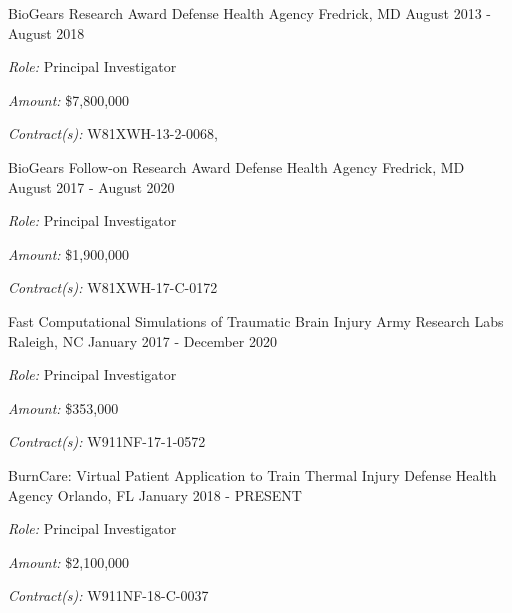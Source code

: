 
\begin{cventries}

  \cventry
    {BioGears Research Award} %
    {Defense Health Agency} %
    {Fredrick, MD} %
    {August 2013 - August 2018} %
     {
     \begin{cvitems}
     \item{\textit{Role:} Principal Investigator}
     \item{\textit{Amount:} \$7,800,000}
     \item{\textit{Contract(s):} W81XWH-13-2-0068,}
     \end{cvitems}
     }

  \cventry
    {BioGears Follow-on Research Award} %
    {Defense Health Agency} %
    {Fredrick, MD} %
    {August 2017 - August 2020} %
     {
     \begin{cvitems}
     \item{\textit{Role:} Principal Investigator}
     \item{\textit{Amount:} \$1,900,000}
     \item{\textit{Contract(s):} W81XWH-17-C-0172}
     \end{cvitems}
     }

  \cventry
    {Fast Computational Simulations of Traumatic Brain Injury} %
    {Army Research Labs} %
    {Raleigh, NC} %
    {January 2017 - December 2020} %
     {
     \begin{cvitems}
     \item{\textit{Role:} Principal Investigator}
     \item{\textit{Amount:} \$353,000}
    \item{\textit{Contract(s):} W911NF-17-1-0572}
     \end{cvitems}
     }

  \cventry
    {BurnCare: Virtual Patient Application to Train Thermal Injury} %
    {Defense Health Agency} %
    {Orlando, FL} %
    {January 2018 - PRESENT} %
     {
    \begin{cvitems}
     \item{\textit{Role:} Principal Investigator}
     \item{\textit{Amount:} \$2,100,000}
    \item{\textit{Contract(s):} W911NF-18-C-0037}
    \end{cvitems}
     }


\end{cventries}
